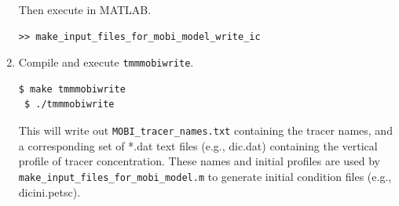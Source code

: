 \documentclass[a4paper]{article}
\def\noin{\noindent }
\begin{document}
\begin{enumerate}
\begin{lstlisting}[frame=single,basicstyle=\scriptsize,commentstyle=\color{blue}]
\end{lstlisting}
\noin Then execute in MATLAB.
\begin{lstlisting}[style=DOS]
 >> make_input_files_for_mobi_model_write_ic
\end{lstlisting}

\item Compile and execute \verb|tmmmobiwrite|. 
\begin{lstlisting}[style=DOS]
 $ make tmmmobiwrite
 $ ./tmmmobiwrite
\end{lstlisting}
\noin This will write out \verb|MOBI_tracer_names.txt| containing the tracer names, and a corresponding set of *.dat text files (e.g., dic.dat) containing the vertical profile of tracer concentration. These names and initial profiles are used by \verb|make_input_files_for_mobi_model.m| to generate initial condition files (e.g., dicini.petsc). 


\end{enumerate}
\end{document}
